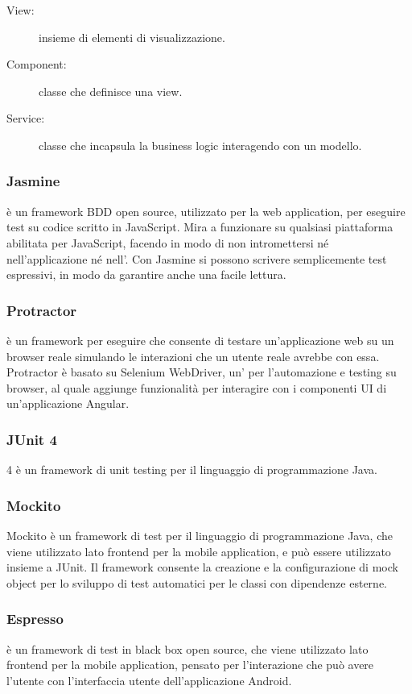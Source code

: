 \documentclass[../../manuale-manutentore.tex]{subfiles}
\begin{document}
\begin{description}
    \item[View:] insieme di elementi di visualizzazione.
    \item[Component:] classe che definisce una view.
    \item[Service:] classe che incapsula la business logic interagendo con un modello.
\end{description}

\subsubsection{Jasmine}%
\label{subs:jasmine}

 è un framework BDD open source, utilizzato per la web application, per eseguire test su codice scritto in JavaScript.
Mira a funzionare su qualsiasi piattaforma abilitata per JavaScript, facendo in modo di non intromettersi né nell'applicazione né nell'.
Con Jasmine si possono scrivere semplicemente test espressivi, in modo da garantire anche una facile lettura.

\subsubsection{Protractor}%
\label{subs:protractor}

 è un framework per eseguire  che consente di testare un'applicazione web su un browser reale simulando le interazioni che un utente reale avrebbe con essa.
Protractor è basato su Selenium WebDriver, un' per l'automazione e testing su browser, al quale aggiunge funzionalità per interagire con i componenti UI di un'applicazione Angular.

\subsubsection{JUnit 4}%
\label{subs:junit4}

 4 è un framework di unit testing per il linguaggio di programmazione Java.

\subsubsection{Mockito}%
\label{subs:mockito}

Mockito è un framework di test per il linguaggio di programmazione Java, che viene utilizzato lato frontend per la mobile application, e può essere utilizzato insieme a JUnit.
Il framework consente la creazione e la configurazione di mock object per lo sviluppo di test automatici per le classi con dipendenze esterne.

\subsubsection{Espresso}%
\label{subs:espresso}

 è un framework di test in black box open source, che viene utilizzato lato frontend per la mobile application, pensato per l'interazione che può avere l'utente con l'interfaccia utente dell'applicazione Android.
\end{document}

